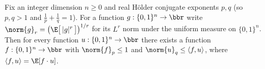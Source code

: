 \begin{lemma}
\label{BooleanAnalysis.Hypercontractivity.holder_sharpness}
\leanok
{}
Fix an integer dimension $n\ge0$ and real Hölder conjugate exponents $p, q$ (so $p, q > 1$ and $\tfrac1p +
\tfrac1q = 1$). For a function $g : \{0,1\}^n \to \bbr$ write $\norm{g}_r =
\bigl(\E\bigl[\,|g|^r\,\bigr]\bigr)^{1/r}$ for its $L^r$ norm under the uniform measure
on $\{0,1\}^n$. Then for every function $u : \{0,1\}^n \to \bbr$ there exists a function
$f : \{0,1\}^n \to \bbr$ with $\norm{f}_p \le 1$ and $\norm{u}_q \le \langle f,
u\rangle$, where $\langle f, u\rangle = \E[f\cdot u]$.
\end{lemma}

